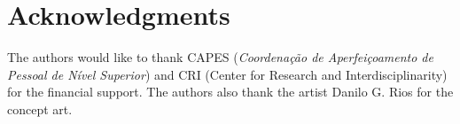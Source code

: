\documentclass{sigchi}
\begin{document}
\section{Acknowledgments}

	The authors would like to thank CAPES (\textit{Coordena\c{c}\~ao de Aperfei\c{c}oamento de Pessoal de N\'ivel Superior}) and CRI (Center for Research and Interdisciplinarity) for the financial support. The authors also thank the artist Danilo G. Rios for the concept art.

%
%
%
%
%
\balance



\end{document}
